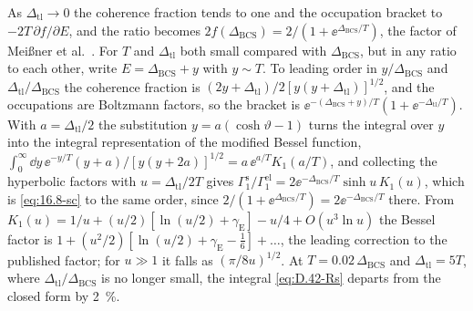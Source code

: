 As $\Delta_{\mathrm{tl}} \to 0$ the coherence fraction tends to one and the occupation bracket to $-2T\,\partial f/\partial E$, and the ratio becomes $2f(\Delta_{\mathrm{BCS}}) = 2/(1 + \ee^{\Delta_{\mathrm{BCS}}/T})$, the factor of Meißner et al.~\cite[Eq.~(9)]{meissner2021acoustic}. For $T$ and $\Delta_{\mathrm{tl}}$ both small compared with $\Delta_{\mathrm{BCS}}$, but in any ratio to each other, write $E = \Delta_{\mathrm{BCS}} + y$ with $y \sim T$. To leading order in $y/\Delta_{\mathrm{BCS}}$ and $\Delta_{\mathrm{tl}}/\Delta_{\mathrm{BCS}}$ the coherence fraction is $(2y + \Delta_{\mathrm{tl}})/2[y(y + \Delta_{\mathrm{tl}})]^{1/2}$, and the occupations are Boltzmann factors, so the bracket is $\ee^{-(\Delta_{\mathrm{BCS}} + y)/T}(1 + \ee^{-\Delta_{\mathrm{tl}}/T})$. With $a = \Delta_{\mathrm{tl}}/2$ the substitution $y = a(\cosh\vartheta - 1)$ turns the integral over $y$ into the integral representation of the modified Bessel function, $\int_0^\infty\dd y\,\ee^{-y/T}(y + a)/[y(y + 2a)]^{1/2} = a\,\ee^{a/T}K_1(a/T)$, and collecting the hyperbolic factors with $u = \Delta_{\mathrm{tl}}/2T$ gives $\varGamma_1^{\mathrm{s}}/\varGamma_1^{\mathrm{el}} = 2\ee^{-\Delta_{\mathrm{BCS}}/T}\sinh u\,K_1(u)$, which is \cref{eq:16.8-sc} to the same order, since $2/(1 + \ee^{\Delta_{\mathrm{BCS}}/T}) = 2\ee^{-\Delta_{\mathrm{BCS}}/T}$ there. From $K_1(u) = 1/u + (u/2)[\ln(u/2) + \gamma_{\mathrm{E}}] - u/4 + O(u^3\ln u)$ the Bessel factor is $1 + (u^2/2)[\ln(u/2) + \gamma_{\mathrm{E}} - \tfrac16] + \dots$, the leading correction to the published factor; for $u \gg 1$ it falls as $(\pi/8u)^{1/2}$. At $T = 0.02\,\Delta_{\mathrm{BCS}}$ and $\Delta_{\mathrm{tl}} = 5T$, where $\Delta_{\mathrm{tl}}/\Delta_{\mathrm{BCS}}$ is no longer small, the integral \cref{eq:D.42-Rs} departs from the closed form by \SI{2}{\percent}.
